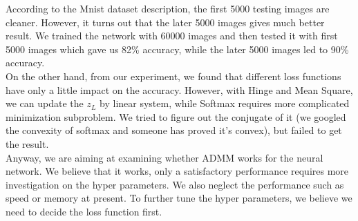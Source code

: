\documentclass{article}
\begin{document}
According to the Mnist dataset description, the first 5000 testing images are cleaner. However, it turns out that the later 5000 images gives much better result. We trained the network with 60000 images and then tested it with first 5000 images which gave us 82\%  accuracy, while the later 5000 images led to 90\% accuracy.\\ 

On the other hand, from our experiment, we found that different loss functions have only a little impact on the accuracy. However,  with Hinge and Mean Square, we can update the $z_L$ by linear system, while Softmax requires more complicated minimization subproblem. We tried to figure out the conjugate of it (we googled the convexity of softmax and someone has proved it's convex), but failed to get the result. \\

Anyway, we are aiming at examining whether ADMM works for the neural network. We believe that it works, only a satisfactory performance requires more investigation on the hyper parameters. We also neglect the performance such as speed or memory at present. To further tune the hyper parameters, we believe we need to decide the loss function first. 
\end{document}
